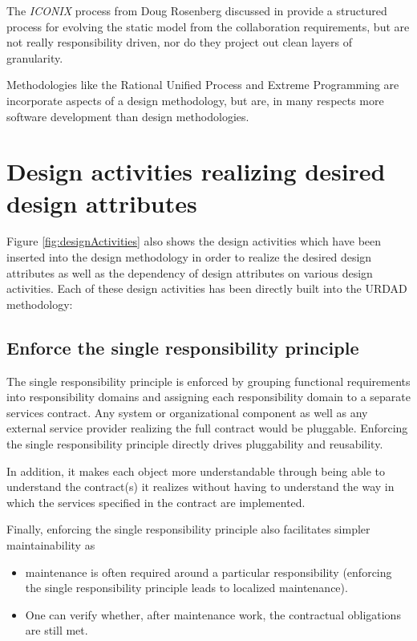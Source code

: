 \documentclass{IOS-Book-Article}
\begin{document}
The {\em ICONIX} process from Doug Rosenberg discussed in \cite{rosenberg:useCaseDrivenObjectModeling} provide a structured process for evolving the static model from the collaboration requirements, but are not really responsibility driven, nor do they project out clean layers of granularity.

Methodologies like the Rational Unified Process \cite{kruchten:rup} and Extreme Programming are incorporate aspects of a design methodology, but are, in many respects
more software development than design methodologies.



\section{Design activities realizing desired design attributes}

Figure \ref{fig:designActivities} also shows the design activities
which have been inserted into the design methodology in order to realize the
desired design attributes
as well as the dependency of design attributes on various design activities.
Each of these design activities has been directly built into the URDAD methodology:


\subsection{Enforce the single responsibility principle}

The single responsibility principle is enforced by grouping functional requirements into responsibility
domains and assigning each responsibility domain to a separate services contract. Any system or organizational
component as well as any external service provider realizing the full contract would be pluggable. Enforcing
the single responsibility principle directly drives pluggability and reusability. 

In addition, it makes each
object more understandable through being able to understand the contract(s) it realizes without having to 
understand the way in which the services specified in the contract are implemented.

Finally, enforcing the single responsibility principle also facilitates simpler maintainability as
\begin{itemize}
  \item maintenance is often required around a particular responsibility (enforcing the single responsibility
    principle leads to localized maintenance).
  \item One can verify whether, after maintenance work, the contractual obligations are still met.
\end{itemize}
\end{document}
